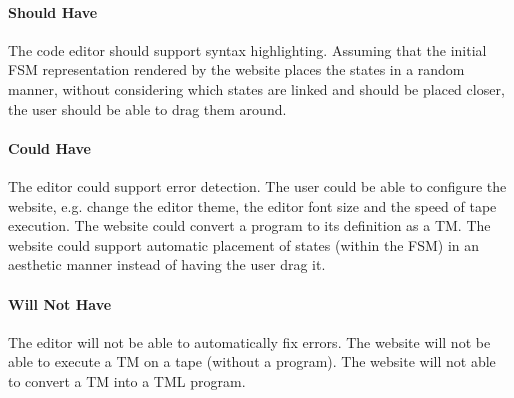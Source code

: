 \paragraph{Should Have} The code editor should support syntax highlighting. Assuming that the initial FSM representation rendered by the website places the states in a random manner, without considering which states are linked and should be placed closer, the user should be able to drag them around.

\paragraph{Could Have} The editor could support error detection. The user could be able to configure the website, e.g. change the editor theme, the editor font size and the speed of tape execution. The website could convert a program to its definition as a TM. The website could support automatic placement of states (within the FSM) in an aesthetic manner instead of having the user drag it.

\paragraph{Will Not Have} The editor will not be able to automatically fix errors. The website will not be able to execute a TM on a tape (without a program). The website will not able to convert a TM into a TML program.


